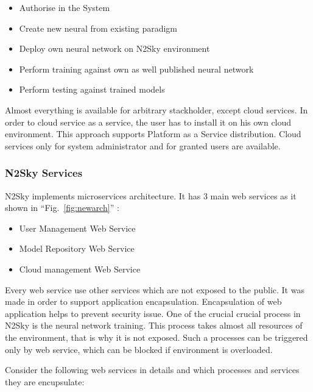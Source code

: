 \begin{itemize}
\item Authorise in the System
\item Create new neural from existing paradigm
\item Deploy own neural network on N2Sky environment 
\item Perform training against own as well published neural network
\item Perform testing against trained models
\end{itemize}

Almost everything is available for arbitrary stackholder, except cloud services. In order to cloud service as a service, the user has to install it on his own cloud environment. This approach supports Platform as a Service distribution. Cloud services only for system administrator and for granted users are available. 


\subsubsection{N2Sky Services}\label{N2Sky Services}

 N2Sky implements microservices architecture. It has 3 main web services as it shown in ``Fig.~\ref{fig:newarch}'' :
 
\begin{itemize}
\item User Management Web Service
\item Model Repository Web Service
\item Cloud management Web Service
\end{itemize}

Every web service use other services which are not exposed to the public. It was made in order to support application encapsulation. Encapsulation of web application helps to prevent security issue. One of the crucial crucial process in N2Sky is the neural network training. This process takes almost all resources of the environment, that is why it is not exposed. Such a processes can be triggered only by web service, which can be blocked if environment is overloaded.

Consider the following web services in details and which processes and services they are encupsulate:  

